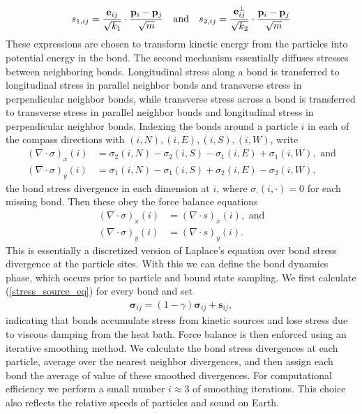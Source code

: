\documentclass[12pt,letterpaper]{article}
\newcommand{\mb}{\mathbf}
\begin{document}
\begin{itemize}
\begin{align}
\label{stress_source_eq}
s_{1,ij} = {\mb{e}_{ij} \over \sqrt{k_{1}}} \cdot {\mb{p}_{i} - \mb{p}_{j} \over \sqrt{m}} \quad \textrm{and} \quad s_{2,ij} = {\mb{e}^{\perp}_{ij} \over \sqrt{k_{2}}} \cdot {\mb{p}_{i} - \mb{p}_{j} \over \sqrt{m}}
\end{align}
These expressions are chosen to transform kinetic energy from the particles into potential energy in the bond. The second mechanism essentially diffuses stresses between neighboring bonds. Longitudinal stress along a bond is transferred to longitudinal stress in parallel neighbor bonds and transverse stress in perpendicular neighbor bonds, while transverse stress across a bond is transferred to transverse stress in parallel neighbor bonds and longitudinal stress in perpendicular neighbor bonds. Indexing the bonds around a particle $i$ in each of the compass directions with $(i, N), (i, E), (i, S), (i, W)$, write
\begin{align*}
(\nabla \cdot \sigma)_{x}(i) &= \sigma_{2}(i, N) - \sigma_{2}(i, S) - \sigma_{1}(i, E) + \sigma_{1}(i, W), \textrm{ and} \\
(\nabla \cdot \sigma)_{y}(i) &= \sigma_{1}(i, N) - \sigma_{1}(i, S) + \sigma_{2}(i, E) - \sigma_{2}(i, W),
\end{align*}
the bond stress divergence in each dimension at $i$, where $\sigma_{\cdot}(i, \cdot) = 0$ for each missing bond. Then these obey the force balance equations
\begin{align*}
(\nabla \cdot \sigma)_{x}(i) &= (\nabla \cdot s)_{x}(i), \textrm{ and} \\
(\nabla \cdot \sigma)_{y}(i) &= (\nabla \cdot s)_{y}(i).
\end{align*}
This is essentially a discretized version of Laplace's equation over bond stress divergence at the particle sites. With this we can define the bond dynamics phase, which occurs prior to particle and bound state sampling. We first calculate (\ref{stress_source_eq}) for every bond and set
\begin{align*}
\boldsymbol{\sigma}_{ij} = (1 - \gamma)\boldsymbol{\sigma}_{ij} + \mb{s}_{ij},
\end{align*}
indicating that bonds accumulate stress from kinetic sources and lose stress due to viscous damping from the heat bath. Force balance is then enforced using an iterative smoothing method. We calculate the bond stress divergences at each particle, average over the nearest neighbor divergences, and then assign each bond the average of value of these smoothed divergences. For computational efficiency we perform a small number $i \approx 3$ of smoothing iterations. This choice also reflects the relative speeds of particles and sound on Earth.

\end{itemize}
\end{document}
